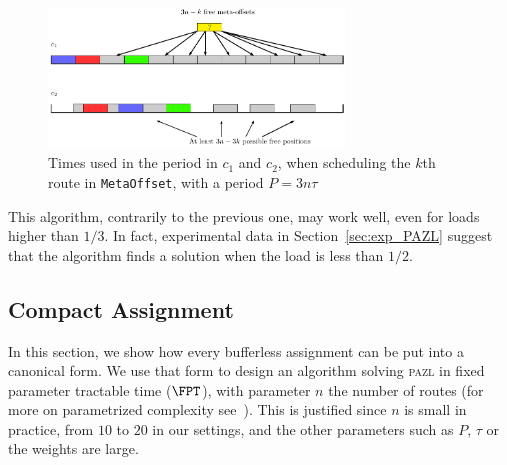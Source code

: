 \documentclass[a4paper,10pt]{journal}
\newcommand\metaoffset{\texttt{MetaOffset}\xspace}
\newcommand\pazl{\textsc{pazl}\xspace}
\begin{document}
     \begin{figure}
      \begin{center}
      \includegraphics[width=0.7\textwidth]{ex3nt.pdf}
      \end{center}
      \caption{Times used in the period in $c_1$ and $c_2$, when scheduling the $k$th route in \metaoffset, with a period $P = 3n\tau$}
      \label{fig:metaoffset}
      \end{figure}


% 
% 
% 
	
This algorithm, contrarily to the previous one, may work well, even for loads higher than $1/3$.
In fact, experimental data in Section~\ref{sec:exp_PAZL} suggest that the algorithm finds a solution when the load is less than $1/2$.


\subsection{Compact Assignment}

In this section, we show how every bufferless assignment can be put into a canonical form.
We use that form to design an algorithm solving \pazl in fixed parameter tractable time ($\FPT$), with parameter $n$ the number of routes (for more on parametrized complexity see~\cite{downey2012parameterized}). This is justified since $n$ is small in practice, from $10$ to $20$ in our settings, and the other parameters such as $P$, $\tau$ or the weights are large.
\end{document}
